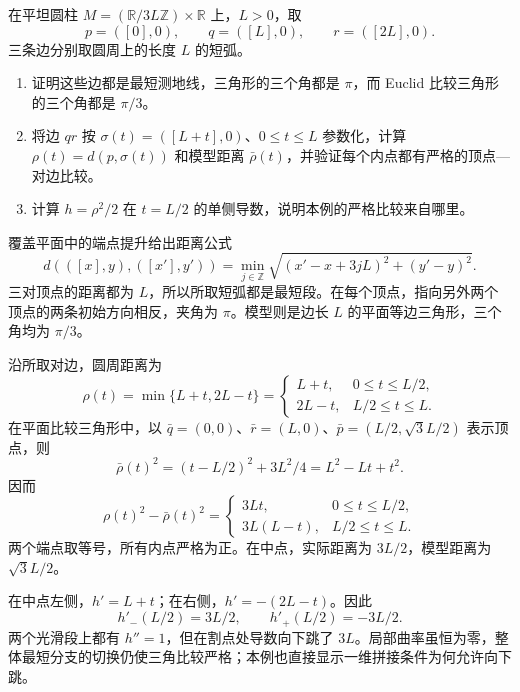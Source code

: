 \begin{optionalexercise}\label{g3:ex:toponogov-flat-cylinder-triangle}
 在平坦圆柱 \(M=(\mathbb R/3L\mathbb Z)\times\mathbb R\) 上，\(L>0\)，取
 \[
 p=([0],0),\qquad q=([L],0),\qquad r=([2L],0).
 \]
 三条边分别取圆周上的长度 \(L\) 的短弧。
 \begin{enumerate}
  \item 证明这些边都是最短测地线，三角形的三个角都是 \(\pi\)，而 Euclid 比较三角形的三个角都是 \(\pi/3\)。
  \item 将边 \(qr\) 按 \(\sigma(t)=([L+t],0)\)、\(0\le t\le L\) 参数化，计算 \(\rho(t)=d(p,\sigma(t))\) 和模型距离 \(\bar\rho(t)\)，并验证每个内点都有严格的顶点—对边比较。
  \item 计算 \(h=\rho^2/2\) 在 \(t=L/2\) 的单侧导数，说明本例的严格比较来自哪里。
 \end{enumerate}
\end{optionalexercise}
\begin{solution}
 覆盖平面中的端点提升给出距离公式
 \[
 d(([x],y),([x'],y'))
 =\min_{j\in\mathbb Z}\sqrt{(x'-x+3jL)^2+(y'-y)^2}.
 \]
 三对顶点的距离都为 \(L\)，所以所取短弧都是最短段。在每个顶点，指向另外两个顶点的两条初始方向相反，夹角为 \(\pi\)。模型则是边长 \(L\) 的平面等边三角形，三个角均为 \(\pi/3\)。

 沿所取对边，圆周距离为
 \[
 \rho(t)=\min\{L+t,2L-t\}
 =\begin{cases}L+t,&0\le t\le L/2,\\2L-t,&L/2\le t\le L.\end{cases}
 \]
 在平面比较三角形中，以 \(\bar q=(0,0)\)、\(\bar r=(L,0)\)、\(\bar p=(L/2,\sqrt3L/2)\) 表示顶点，则
 \[
 \bar\rho(t)^2=(t-L/2)^2+3L^2/4=L^2-Lt+t^2.
 \]
 因而
 \[
 \rho(t)^2-\bar\rho(t)^2
 =\begin{cases}3Lt,&0\le t\le L/2,\\3L(L-t),&L/2\le t\le L.\end{cases}
 \]
 两个端点取等号，所有内点严格为正。在中点，实际距离为 \(3L/2\)，模型距离为 \(\sqrt3L/2\)。

 在中点左侧，\(h' = L+t\)；在右侧，\(h'=-(2L-t)\)。因此
 \[
 h'_-(L/2)=3L/2,\qquad h'_+(L/2)=-3L/2.
 \]
 两个光滑段上都有 \(h''=1\)，但在割点处导数向下跳了 \(3L\)。局部曲率虽恒为零，整体最短分支的切换仍使三角比较严格；本例也直接显示一维拼接条件为何允许向下跳。
\end{solution}


